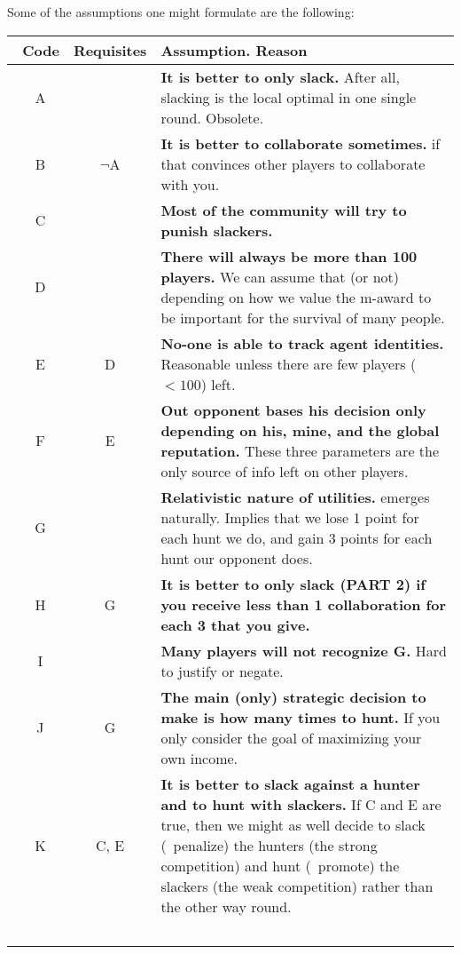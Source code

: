 \documentclass[10pt,fleqn]{article}
\begin{document}
Some of the assumptions one might formulate are the following:

\begin{tabular}{ccp{}}
  \toprule\
  Code & Requisites & {\bfseries Assumption.} Reason \\
  \midrule\
  A & \dash\ & {\bfseries It is better to only slack.} After all, slacking is
  the local optimal in one single round. Obsolete. \\
  \midrule\
  B & $\lnot$A & {\bfseries It is better to collaborate sometimes.} if that
  convinces other players to collaborate with you. \\
  \midrule\
  C & \dash\ & {\bfseries Most of the community will try to punish slackers.} \\
  \midrule\
  D & \dash\ & {\bfseries There will always be more than 100 players.} We can
  assume that (or not) depending on how we value the m-award to be important for
  the survival of many people. \\
  \midrule\
  E & D & {\bfseries No-one is able to track agent identities.} Reasonable
  unless there are few players ($<100$) left. \\
  \midrule\
  F & E & {\bfseries Out opponent bases his decision only depending on his, mine,
  and the global reputation.} These three parameters are the only source of info
  left on other players. \\
  \midrule\
  G & \dash\ & {\bfseries Relativistic nature of utilities.} emerges naturally.
  Implies that we lose 1 point for each hunt we do, and gain 3 points for each
  hunt our opponent does. \\
  \midrule\
  H & G & {\bfseries It is better to only slack (PART 2) if you receive less
  than 1 collaboration for each 3 that you give.} \\
  \midrule\
  I & \dash\ & {\bfseries Many players will not recognize G.} Hard to justify or
  negate. \\
  \midrule\
  J & G & {\bfseries The main (only) strategic decision to make is how many
  times to hunt.} If you only consider the goal of maximizing your own income.
  \\
  \midrule\
  K & C, E & {\bfseries It is better to slack against a hunter and to hunt
  with slackers.} If C and E are true, then we might as well decide to slack
  (\ie\ penalize) the hunters (the strong competition) and hunt (\ie\ promote)
  the slackers (the weak competition) rather than the other way round. \\
  \midrule\

\end{tabular}
\end{document}

